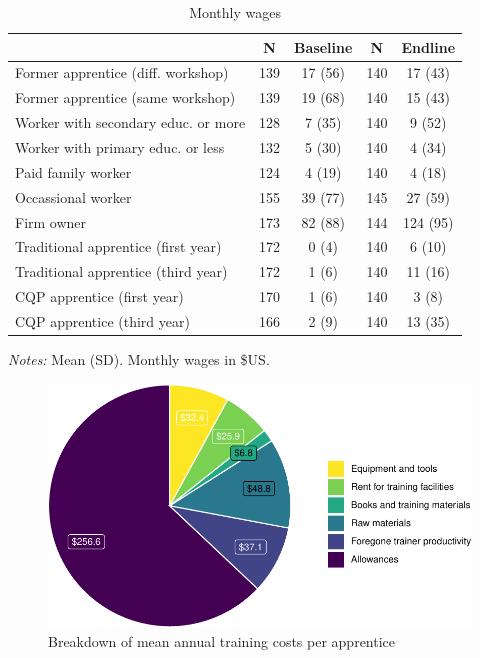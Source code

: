 \documentclass[
  a4paper, twoside, 12pt]{book}
\begin{document}
\begin{table}[H]

\caption{\label{tab:tbl-wages}Monthly wages}
\centering
\fontsize{9}{11}\selectfont
\begin{threeparttable}
\begin{tabular}[t]{lcccc}
\toprule
 & \textbf{N} & \textbf{Baseline} & \textbf{N} & \textbf{Endline}\\
\midrule
Former apprentice (diff. workshop) & 139 & 17 (56) & 140 & 17 (43)\\
Former apprentice (same workshop) & 139 & 19 (68) & 140 & 15 (43)\\
Worker with secondary educ. or more & 128 & 7 (35) & 140 & 9 (52)\\
Worker with primary educ. or less & 132 & 5 (30) & 140 & 4 (34)\\
Paid family worker & 124 & 4 (19) & 140 & 4 (18)\\
Occassional worker & 155 & 39 (77) & 145 & 27 (59)\\
Firm owner & 173 & 82 (88) & 144 & 124 (95)\\
Traditional apprentice (first year) & 172 & 0 (4) & 140 & 6 (10)\\
Traditional apprentice (third year) & 172 & 1 (6) & 140 & 11 (16)\\
CQP apprentice (first year) & 170 & 1 (6) & 140 & 3 (8)\\
CQP apprentice (third year) & 166 & 2 (9) & 140 & 13 (35)\\
\bottomrule
\end{tabular}
\begin{tablenotes}
\item \textit{Notes:} Mean (SD). Monthly wages in \$US.
\end{tablenotes}
\end{threeparttable}
\end{table}

\begin{figure}[H]
\includegraphics{figures/fig-costspie-1} \caption{Breakdown of mean annual training costs per apprentice}\label{fig:fig-costspie}
\end{figure}
\end{document}
